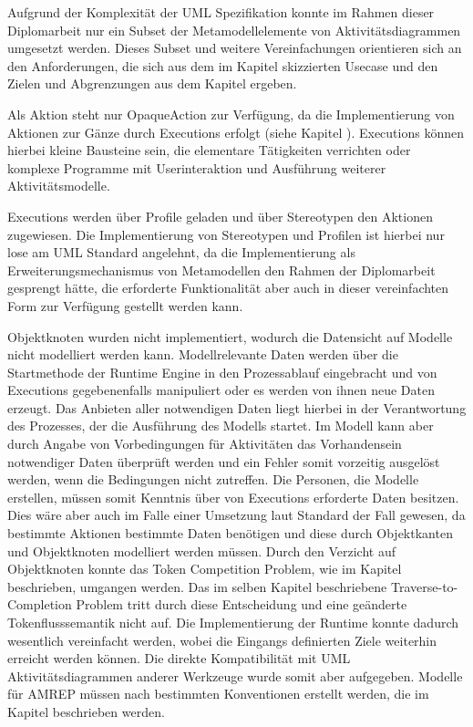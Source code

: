 Aufgrund der Komplexität der UML Spezifikation konnte im Rahmen dieser Diplomarbeit nur ein Subset der Metamodellelemente von Aktivitätsdiagrammen umgesetzt werden. Dieses Subset und weitere Vereinfachungen orientieren sich an den Anforderungen, die sich aus dem im Kapitel  skizzierten Usecase und den Zielen und Abgrenzungen aus dem Kapitel  ergeben.

Als Aktion steht nur OpaqueAction zur Verfügung, da die Implementierung von Aktionen zur Gänze durch Executions erfolgt (siehe Kapitel ). Executions können hierbei kleine Bausteine sein, die elementare Tätigkeiten verrichten oder komplexe Programme mit Userinteraktion und Ausführung weiterer Aktivitätsmodelle.

Executions werden über Profile geladen und über Stereotypen den Aktionen zugewiesen. Die Implementierung von Stereotypen und Profilen ist hierbei nur lose am UML Standard angelehnt, da die Implementierung als Erweiterungsmechanismus von Metamodellen den Rahmen der Diplomarbeit gesprengt hätte, die erforderte Funktionalität aber auch in dieser vereinfachten Form zur Verfügung gestellt werden kann.

Objektknoten wurden nicht implementiert, wodurch die Datensicht auf Modelle nicht modelliert werden kann. Modellrelevante Daten werden über die Startmethode der Runtime Engine in den Prozessablauf eingebracht und von Executions gegebenenfalls manipuliert oder es werden von ihnen neue Daten erzeugt. Das Anbieten aller notwendigen Daten liegt hierbei in der Verantwortung des Prozesses, der die Ausführung des Modells startet. Im Modell kann aber durch Angabe von Vorbedingungen für Aktivitäten das Vorhandensein notwendiger Daten überprüft werden und ein Fehler somit vorzeitig ausgelöst werden, wenn die Bedingungen nicht zutreffen. Die Personen, die Modelle erstellen, müssen somit Kenntnis über von Executions erforderte Daten besitzen. Dies wäre aber auch im Falle einer Umsetzung laut Standard der Fall gewesen, da bestimmte Aktionen bestimmte Daten benötigen und diese durch Objektkanten und Objektknoten modelliert werden müssen. Durch den Verzicht auf Objektknoten konnte das Token Competition Problem, wie im Kapitel  beschrieben, umgangen werden. Das im selben Kapitel beschriebene Traverse-to-Completion Problem tritt durch diese Entscheidung und eine geänderte Tokenflusssemantik nicht auf. Die Implementierung der Runtime konnte dadurch wesentlich vereinfacht werden, wobei die Eingangs definierten Ziele weiterhin erreicht werden können. Die direkte Kompatibilität mit UML Aktivitätsdiagrammen anderer Werkzeuge wurde somit aber aufgegeben. Modelle für AMREP müssen nach bestimmten Konventionen erstellt werden, die im Kapitel  beschrieben werden.

